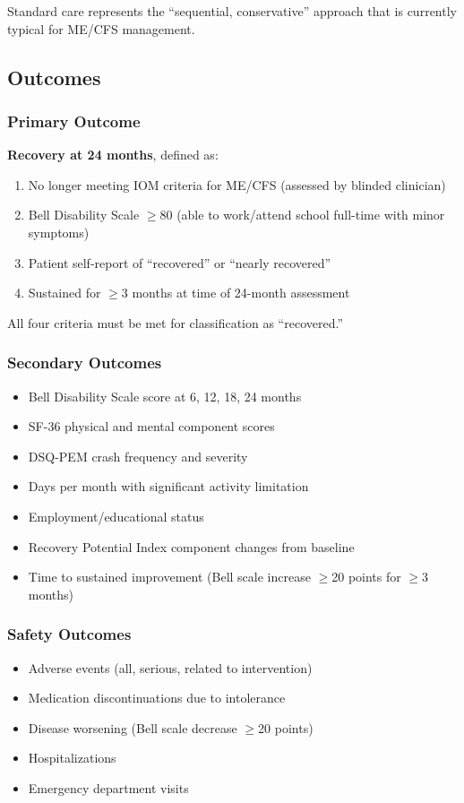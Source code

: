 Standard care represents the ``sequential, conservative'' approach that is currently typical for ME/CFS management.

\subsection{Outcomes}

\subsubsection{Primary Outcome}
\textbf{Recovery at 24 months}, defined as:
\begin{enumerate}
    \item No longer meeting IOM criteria for ME/CFS (assessed by blinded clinician)
    \item Bell Disability Scale $\geq$80 (able to work/attend school full-time with minor symptoms)
    \item Patient self-report of ``recovered'' or ``nearly recovered''
    \item Sustained for $\geq$3 months at time of 24-month assessment
\end{enumerate}

All four criteria must be met for classification as ``recovered.''

\subsubsection{Secondary Outcomes}
\begin{itemize}
    \item Bell Disability Scale score at 6, 12, 18, 24 months
    \item SF-36 physical and mental component scores
    \item DSQ-PEM crash frequency and severity
    \item Days per month with significant activity limitation
    \item Employment/educational status
    \item Recovery Potential Index component changes from baseline
    \item Time to sustained improvement (Bell scale increase $\geq$20 points for $\geq$3 months)
\end{itemize}

\subsubsection{Safety Outcomes}
\begin{itemize}
    \item Adverse events (all, serious, related to intervention)
    \item Medication discontinuations due to intolerance
    \item Disease worsening (Bell scale decrease $\geq$20 points)
    \item Hospitalizations
    \item Emergency department visits
\end{itemize}

